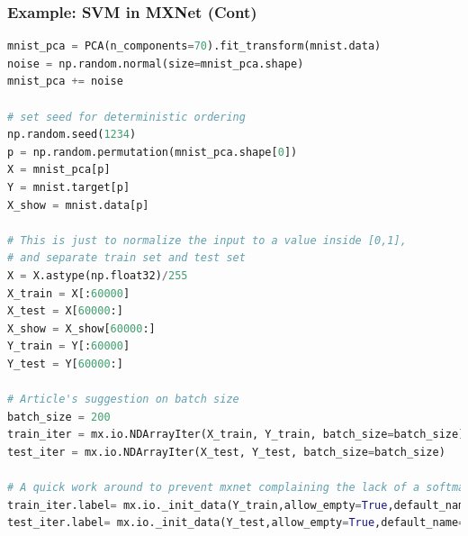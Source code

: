 \begin{frame}[fragile]
  \MyLogo
  \frametitle{Example: SVM in MXNet (Cont)}  

\ContinueLineNumber
\scriptsize{
\begin{lstlisting}[language=python]
mnist_pca = PCA(n_components=70).fit_transform(mnist.data)
noise = np.random.normal(size=mnist_pca.shape)
mnist_pca += noise

# set seed for deterministic ordering
np.random.seed(1234) 
p = np.random.permutation(mnist_pca.shape[0])
X = mnist_pca[p]
Y = mnist.target[p]
X_show = mnist.data[p]

# This is just to normalize the input to a value inside [0,1],
# and separate train set and test set
X = X.astype(np.float32)/255
X_train = X[:60000]
X_test = X[60000:]
X_show = X_show[60000:]
Y_train = Y[:60000]
Y_test = Y[60000:]

# Article's suggestion on batch size
batch_size = 200
train_iter = mx.io.NDArrayIter(X_train, Y_train, batch_size=batch_size)
test_iter = mx.io.NDArrayIter(X_test, Y_test, batch_size=batch_size)

# A quick work around to prevent mxnet complaining the lack of a softmax_label
train_iter.label= mx.io._init_data(Y_train,allow_empty=True,default_name='svm_label')
test_iter.label= mx.io._init_data(Y_test,allow_empty=True,default_name='svm_label')

\end{lstlisting}
}
\vskip 100pt

\end{frame}

